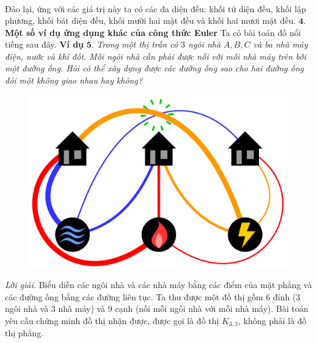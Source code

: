\begin{multicols}{2}
\begin{align*}
	\end{align*}
	Đảo lại, ứng với các giá trị này ta có các đa diện đều: khối tứ diện đều, khối lập phương, khối bát diện đều, khối mười hai mặt đều và khối hai mươi mặt đều.
	\vskip 0.1cm
	$\pmb{4.}$ \textbf{\color{hoccungpi}Một số ví dụ ứng dụng khác của công thức Euler}
	\vskip 0.1cm
	Ta có bài toán đố nổi tiếng sau đây.
	\vskip 0.1cm
	\textbf{\color{hoccungpi}Ví dụ} $\pmb{5.}$ \textit{Trong một thị trấn có $3$ ngôi nhà $A, B, C$ và ba nhà máy điện, nước và khí đốt. Mỗi ngôi nhà cần phải được nối với mỗi nhà máy trên bởi một đường ống. Hỏi có thể xây dựng được các đường ống sao cho hai đường ống đôi một không giao nhau hay không?}
	\begin{figure}[H]
		\centering
		\vspace*{-5pt}
		\captionsetup{labelformat= empty, justification=centering}
		\includegraphics[width=1\linewidth]{3_utilities}
		\vspace*{-10pt}
	\end{figure}
	\textit{Lời giải.} Biểu diễn các ngôi nhà và các nhà máy bằng các điểm của mặt phẳng và các đường ống bằng các đường liên tục. Ta thu được một đồ thị gồm $6$ đỉnh ($3$ ngôi nhà và $3$ nhà máy) và $9$ cạnh (nối mỗi ngôi nhà với mỗi nhà máy).  Bài toán yêu cầu chứng minh đồ thị nhận được, được gọi là đồ thị $K_{3, 3}$, không phải là đồ thị phẳng.
	\begin{figure}[H]
		\centering
		\vspace*{-5pt}
		\captionsetup{labelformat= empty, justification=centering}

\end{figure}
\end{multicols}
